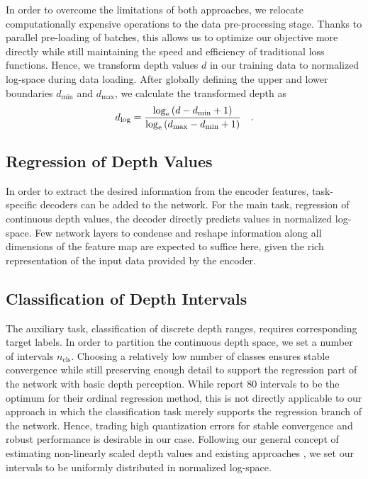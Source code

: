 \documentclass[lang=english]{tumarxivarticle}
\newcommand{\citep}{\parencite}
\newcommand{\citet}{\textcite}
\begin{document}
In order to overcome the limitations of both approaches, we relocate computationally expensive operations to the data pre-processing stage.
Thanks to parallel pre-loading of batches, this allows us to optimize our objective more directly while still maintaining the speed and efficiency of traditional loss functions.
Hence, we transform depth values $d$ in our training data to normalized log-space during data loading.
After globally defining the upper and lower boundaries $d_\text{min}$ and $d_\text{max}$, we calculate the transformed depth as
\begin{align}
  d_\text{log} = \frac{
                  \log_{\mathrm{e}} \left( d - d_\text{min} + 1 \right)
                }{
                  \log_{\mathrm{e}} \left( d_\text{max} - d_\text{min} + 1 \right)
                }
                \quad \text{.}
  \label{eq:encode_depth}
\end{align}


\subsection{Regression of Depth Values}

In order to extract the desired information from the encoder features, task-specific decoders can be added to the network.
For the main task, \ie regression of continuous depth values, the decoder directly predicts values in normalized log-space.
Few network layers to condense and reshape information along all dimensions of the feature map are expected to suffice here, given the rich representation of the input data provided by the encoder.


\subsection{Classification of Depth Intervals}

The auxiliary task, \ie classification of discrete depth ranges, requires corresponding target labels.
In order to partition the continuous depth space, we set a number of intervals $n_\text{cls}$.
Choosing a relatively low number of classes ensures stable convergence while still preserving enough detail to support the regression part of the network with basic depth perception.
While \citet{Fu18} report 80 intervals to be the optimum for their ordinal regression method, this is not directly applicable to our approach in which the classification task merely supports the regression branch of the network.
Hence, trading high quantization errors for stable convergence and robust performance is desirable in our case.
Following our general concept of estimating non-linearly scaled depth values and existing approaches \citep{Fu18}, we set our intervals to be uniformly distributed in normalized log-space.
\end{document}
